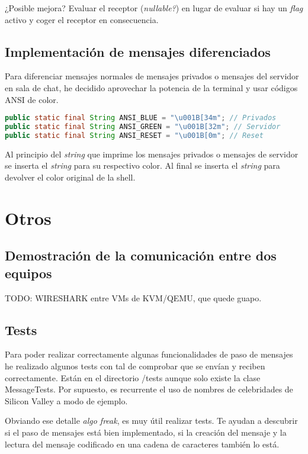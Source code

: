 \documentclass{article}
\begin{document}
¿Posible mejora? Evaluar el receptor (\textit{nullable?}) en lugar de evaluar si hay un \textit{flag} activo y coger el receptor en consecuencia.

\subsection{Implementación de mensajes diferenciados}

Para diferenciar mensajes normales de mensajes privados o mensajes del servidor en sala de chat, he decidido aprovechar la potencia de la terminal y usar códigos ANSI de color.

\begin{lstlisting}[language=Java, caption=Colores]
public static final String ANSI_BLUE = "\u001B[34m"; // Privados
public static final String ANSI_GREEN = "\u001B[32m"; // Servidor
public static final String ANSI_RESET = "\u001B[0m"; // Reset
\end{lstlisting}

Al principio del \textit{string} que imprime los mensajes privados o mensajes de servidor se inserta el \textit{string} para su respectivo color. Al final se inserta el \textit{string} para devolver el color original de la shell.

\section{Otros}


\subsection{Demostración de la comunicación entre dos equipos}

TODO: WIRESHARK entre VMs de KVM/QEMU, que quede guapo.




\subsection{Tests}

Para poder realizar correctamente algunas funcionalidades de paso de mensajes he realizado algunos tests con tal de comprobar que se envían y reciben correctamente. Están en el directorio /tests aunque solo existe la clase MessageTests. Por supuesto, es recurrente el uso de nombres de celebridades de Silicon Valley a modo de ejemplo.

Obviando ese detalle \textit{algo freak}, es muy útil realizar tests. Te ayudan a descubrir si el paso de mensajes está bien implementado, si la creación del mensaje y la lectura del mensaje codificado en una cadena de caracteres también lo está.
\end{document}

